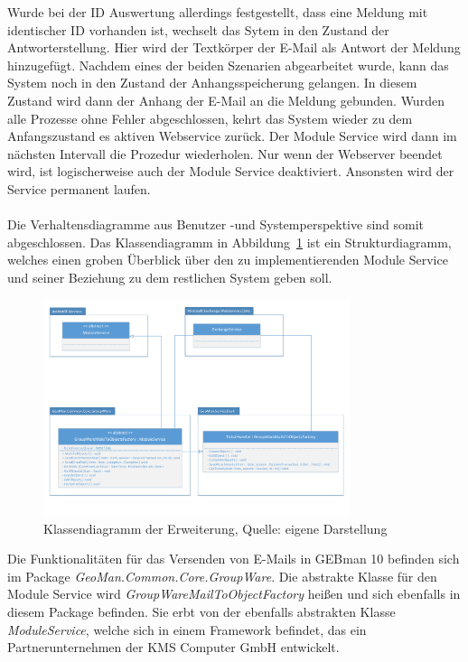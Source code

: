 \noindent
Wurde bei der ID Auswertung allerdings festgestellt, dass eine Meldung mit identischer ID vorhanden ist, wechselt das Sytem in den Zustand der Antworterstellung. Hier wird der Textkörper der E-Mail als Antwort der Meldung hinzugefügt.\newline
Nachdem eines der beiden Szenarien abgearbeitet wurde, kann das System noch in den Zustand der Anhangsspeicherung gelangen. In diesem Zustand wird dann der Anhang der E-Mail an die Meldung gebunden. Wurden alle Prozesse ohne Fehler abgeschlossen, kehrt das System wieder zu dem Anfangszustand es aktiven Webservice zurück. Der Module Service wird dann im nächsten Intervall die Prozedur wiederholen. Nur wenn der Webserver beendet wird, ist logischerweise auch der Module Service deaktiviert. Ansonsten wird der Service permanent laufen.\\\\

\noindent
Die Verhaltensdiagramme aus Benutzer -und Systemperspektive sind somit abgeschlossen. Das Klassendiagramm in Abbildung~\ref{fig:Klassendiagramm} ist ein Strukturdiagramm, welches einen groben Überblick über den zu implementierenden Module Service und seiner Beziehung zu dem restlichen System geben soll. \newpage 

\begin{figure}[h!]
\centering
\includegraphics[width=0.80\textwidth]{Abbildungen/Klassendiagramm.pdf}
	\caption[Klassendiagramm der Erweiterung]{Klassendiagramm der Erweiterung, Quelle: eigene Darstellung}
	\label{fig:Klassendiagramm}
\end{figure}

\noindent
Die Funktionalitäten für das Versenden von E-Mails in GEBman 10 befinden sich im Package \textit{GeoMan.Common.Core.GroupWare}. Die abstrakte Klasse für den Module Service wird \textit{GroupWareMailToObjectFactory} heißen und sich ebenfalls in diesem Package befinden. Sie erbt von der ebenfalls abstrakten Klasse \textit{ModuleService}, welche sich in einem Framework befindet, das ein Partnerunternehmen der KMS Computer GmbH entwickelt.\\ 

